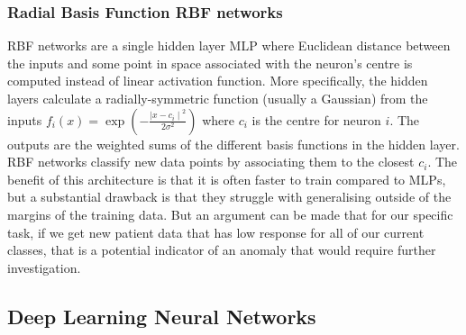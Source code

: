 \documentclass[11pt,a4paper]{article}
\begin{document}

\subsubsection{Radial Basis Function RBF networks}
RBF networks are a single hidden layer MLP where Euclidean distance between the inputs and some point in space associated with the neuron's centre is computed instead of linear activation function. More specifically, the hidden layers calculate a radially-symmetric function (usually a Gaussian) from the inputs \(f_i(x) = \exp \left(-\frac{{\mid x - c_i \mid}^2}{2 \sigma^2} \right) \) where \(c_i\) is the centre for neuron \(i\). The outputs are the weighted sums of the different basis functions in the hidden layer.
RBF networks classify new data points by associating them to the closest \(c_i\). The benefit of this architecture is that it is often faster to train compared to MLPs, but a substantial drawback is that they struggle with generalising outside of the margins of the training data. But an argument can be made that for our specific task, if we get new patient data that has low response for all of our current classes, that is a potential indicator of an anomaly that would require further investigation.

\subsection{Deep Learning Neural Networks}
\end{document}
